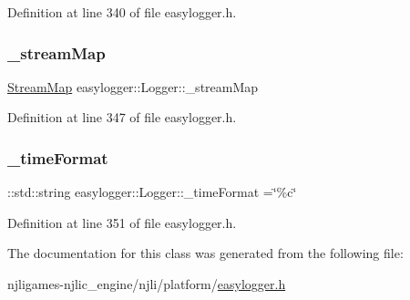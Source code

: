 Definition at line 340 of file easylogger.\+h.

\mbox{\label{classeasylogger_1_1_logger_a9290bed24c12786abef2c421158268f8}} 
\subsubsection{\texorpdfstring{\+\_\+stream\+Map}{\_streamMap}}
{\footnotesize\ttfamily \mbox{\hyperlink{classeasylogger_1_1_logger_a27625e597ce11062ffd04fc8ca5154cd}{Stream\+Map}} easylogger\+::\+Logger\+::\+\_\+stream\+Map\hspace{0.3cm}{\ttfamily [private]}}



Definition at line 347 of file easylogger.\+h.

\mbox{\label{classeasylogger_1_1_logger_a692cc5f57c16a7399d5630b1623bd613}} 
\subsubsection{\texorpdfstring{\+\_\+time\+Format}{\_timeFormat}}
{\footnotesize\ttfamily \+::std\+::string easylogger\+::\+Logger\+::\+\_\+time\+Format =\char`\"{}\%c\char`\"{}\hspace{0.3cm}{\ttfamily [private]}}



Definition at line 351 of file easylogger.\+h.



The documentation for this class was generated from the following file\+:\begin{DoxyCompactItemize}
\item 
njligames-\/njlic\+\_\+engine/njli/platform/\mbox{\hyperlink{easylogger_8h}{easylogger.\+h}}\end{DoxyCompactItemize}
